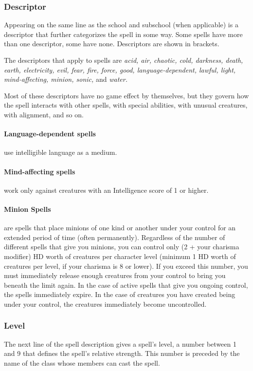 \subsubsection{Descriptor}
Appearing on the same line as the school and subschool (when applicable) is a descriptor that further categorizes the spell in some way. 
Some spells have more than one descriptor, some have none. Descriptors are shown in brackets.

The descriptors that apply to spells are 
\emph{acid, air, chaotic, cold, darkness, death, earth, electricity, evil, fear, fire, force, good, language-dependent, lawful, light, mind-affecting, minion, sonic,} 
and \emph{water.} 

Most of these descriptors have no game effect by themselves, 
but they govern how the spell interacts with other spells, with special abilities, with unusual creatures, with alignment, and so on.

\paragraph{Language-dependent spells} use intelligible language as a medium.

\paragraph{Mind-affecting spells} work only against creatures with an Intelligence score of 1 or higher.

\paragraph[Minion]{Minion Spells} 
\label{sec:MinionSpells}
are spells that place minions of one kind or another under your control for an extended period of 
time (often permanently).
Regardless of the number of different spells that give you minions, you can control only (2 + your charisma modifier) HD worth of creatures per character level (minimum 1 HD worth of creatures per level, if your charisma is 8 or lower). 
If you exceed this number, you must immediately release enough creatures from your control to bring you beneath the limit again.
In the case of active spells that give you ongoing control, the spells immediately expire.
In the case of creatures you have created being under your control, the creatures immediately become uncontrolled.
\subsubsection{Level}
The next line of the spell description gives a spell's level, a number between 1 and 9 that defines the spell's relative strength. 
This number is preceded by the name of the class whose members can cast the spell.

